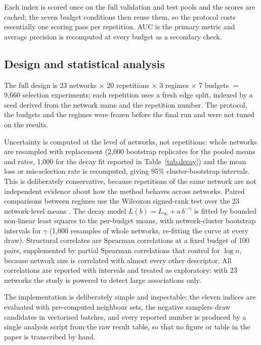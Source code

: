 \documentclass{comjnl}
\begin{document}
Each index is scored once on the full validation and test pools and the scores are cached; the seven budget conditions then reuse them, so the protocol costs essentially one scoring pass per repetition. AUC is the primary metric and average precision is recomputed at every budget as a secondary check.

\subsection{Design and statistical analysis}
\label{sec:stats}

The full design is 23 networks $\times$ 20 repetitions $\times$ 3 regimes $\times$ 7 budgets $=$ 9{,}660 selection experiments; each repetition uses a fresh edge split, indexed by a seed derived from the network name and the repetition number. The protocol, the budgets and the regimes were frozen before the final run and were not tuned on the results.

Uncertainty is computed at the level of networks, not repetitions: whole networks are resampled with replacement (2{,}000 bootstrap replicates for the pooled means and rates, 1{,}000 for the decay fit reported in Table~\ref{tab:decay}) and the mean loss or mis-selection rate is recomputed, giving 95\% cluster-bootstrap intervals. This is deliberately conservative, because repetitions of the same network are not independent evidence about how the method behaves across networks. Paired comparisons between regimes use the Wilcoxon signed-rank test over the 23 network-level means \citep{demsar2006statistical}. The decay model $L(b)=L_\infty+a\,b^{-\gamma}$ is fitted by bounded non-linear least squares to the per-budget means, with network-cluster bootstrap intervals for $\gamma$ (1{,}000 resamples of whole networks, re-fitting the curve at every draw). Structural correlates are Spearman correlations at a fixed budget of 100 pairs, supplemented by partial Spearman correlations that control for $\log n$, because network size is correlated with almost every other descriptor. All correlations are reported with intervals and treated as exploratory: with 23 networks the study is powered to detect large associations only.

The implementation is deliberately simple and inspectable: the eleven indices are evaluated with pre-computed neighbour sets, the negative samplers draw candidates in vectorised batches, and every reported number is produced by a single analysis script from the raw result table, so that no figure or table in the paper is transcribed by hand.
\end{document}
